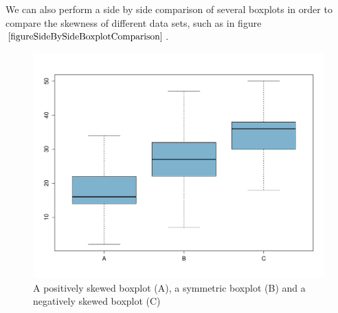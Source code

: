 We can also perform a side by side comparison of several boxplots 
in order to compare the skewness of different data sets,
such as in figure $\ref{figureSideBySideBoxplotComparison}$.


\begin{figure}[H]
\label{figureSideBySideBoxplotComparison}
\begin{center}
\includegraphics[scale=0.4]{Section2/boxplot_abc.pdf}
\end{center}
\vspace*{-0.75cm}
\caption{A positively skewed boxplot (A), a symmetric boxplot (B) and a negatively skewed boxplot (C)}
\end{figure}

